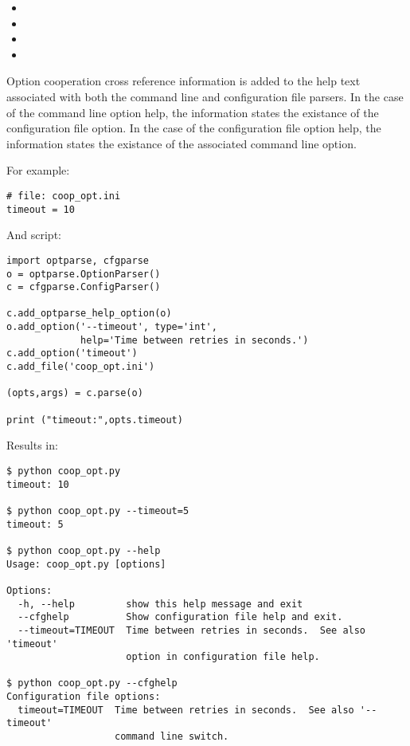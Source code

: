 \documentclass{howto}
\begin{document}
\begin{itemize}
\item {}
\item {}
\item {}
\item {}
\end{itemize}

Option cooperation cross reference information is added to the help text 
associated with both the command line and configuration file parsers.  In the 
case of the command line option help, the information states the existance
of the configuration file option.  In the case of the configuration file option 
help, the information states the existance of the associated command line 
option.

For example:

\begin{verbatim}
# file: coop_opt.ini
timeout = 10
\end{verbatim}

And script:

\begin{verbatim}
import optparse, cfgparse
o = optparse.OptionParser()
c = cfgparse.ConfigParser()

c.add_optparse_help_option(o)
o.add_option('--timeout', type='int', 
             help='Time between retries in seconds.')
c.add_option('timeout')
c.add_file('coop_opt.ini')

(opts,args) = c.parse(o)

print ("timeout:",opts.timeout)
\end{verbatim}

Results in:
\begin{verbatim}
$ python coop_opt.py
timeout: 10

$ python coop_opt.py --timeout=5
timeout: 5

$ python coop_opt.py --help
Usage: coop_opt.py [options]

Options:
  -h, --help         show this help message and exit
  --cfghelp          Show configuration file help and exit.
  --timeout=TIMEOUT  Time between retries in seconds.  See also 'timeout'
                     option in configuration file help.

$ python coop_opt.py --cfghelp
Configuration file options:
  timeout=TIMEOUT  Time between retries in seconds.  See also '--timeout'
                   command line switch.
\end{verbatim}
\end{document}
